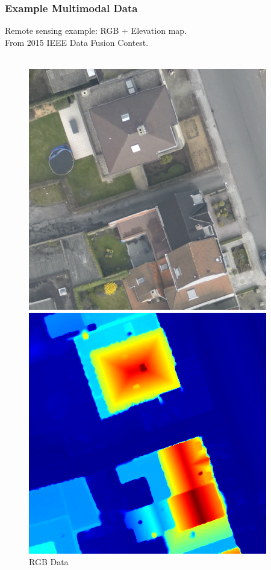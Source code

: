 \documentclass{beamer}
\begin{document}
\begin{frame}
  \frametitle{Example Multimodal Data}
  Remote sensing example: RGB + Elevation map.\\
  From 2015 IEEE Data Fusion Contest.\\
  \cite{DFC2015}\\
  \begin{figure}
    \hfill
    \begin{minipage}[b]{0.40\linewidth}
      \centering
      \includegraphics[width=\textwidth]{./Images/DFC2015/optical.png}
      \caption{RGB Data}
    \end{minipage}
    \hfill
    \begin{minipage}[b]{0.40\linewidth}
      \centering
      \includegraphics[width=\textwidth]{./Images/DFC2015/lidarColor.png}

\end{minipage}
\end{figure}
\end{frame}
\end{document}
